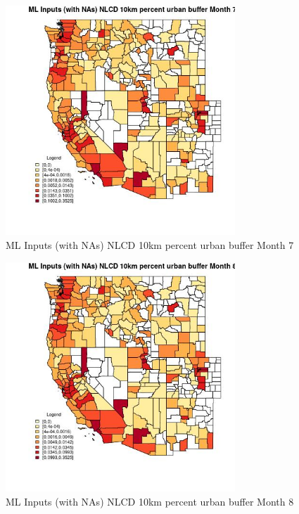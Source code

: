 \begin{figure} 
\centering  
\includegraphics[width=0.77\textwidth]{Code_Outputs/Report_ML_input_PM25_Step4_part_e_de_duplicated_aves_compiled_2019-05-21wNAs_CountyNLCD_10km_percent_urban_buffermedianMonth7.jpg} 
\caption{\label{fig:Report_ML_input_PM25_Step4_part_e_de_duplicated_aves_compiled_2019-05-21wNAsCountyNLCD_10km_percent_urban_buffermedianMonth7}ML Inputs (with NAs) NLCD 10km percent urban buffer Month 7} 
\end{figure} 
 

\begin{figure} 
\centering  
\includegraphics[width=0.77\textwidth]{Code_Outputs/Report_ML_input_PM25_Step4_part_e_de_duplicated_aves_compiled_2019-05-21wNAs_CountyNLCD_10km_percent_urban_buffermedianMonth8.jpg} 
\caption{\label{fig:Report_ML_input_PM25_Step4_part_e_de_duplicated_aves_compiled_2019-05-21wNAsCountyNLCD_10km_percent_urban_buffermedianMonth8}ML Inputs (with NAs) NLCD 10km percent urban buffer Month 8} 
\end{figure} 
 

